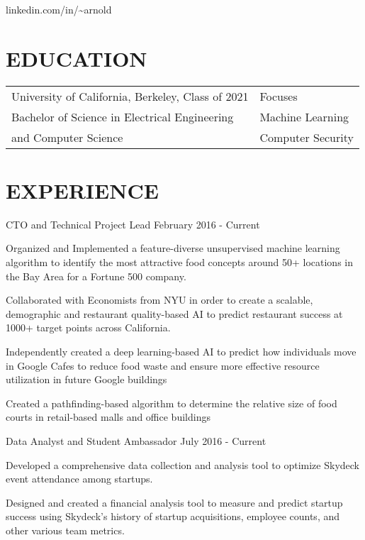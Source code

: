 \documentclass[10pt]{article}
\begin{document}
				 {linkedin.com/in/{\textasciitilde}arnold}      

\section*{EDUCATION}
		
		\begin{tabu}{X[l]X[c]}
			   University of California, Berkeley, Class of 2021 & Focuses \\
 			   Bachelor of Science in Electrical Engineering & Machine Learning \\ 
 			   and Computer Science & Computer Security  \\
		\end{tabu}

\section*{EXPERIENCE}

								{CTO and Technical Project Lead}
								{February 2016 - Current}                  		
	                   \begin{accomplishments} 
	                    		\item Organized and Implemented a feature-diverse unsupervised machine learning algorithm to identify the most attractive food concepts around 50+ locations in the Bay Area for a Fortune 500 company.
	                    		\item Collaborated with Economists from NYU in order to create a scalable, demographic and restaurant quality-based AI to predict restaurant success at 1000+ target points across California.
	                    		\item Independently created a deep learning-based AI to predict how individuals move in Google Cafes to reduce food waste and ensure more effective resource utilization in future Google buildings
	                    		\item Created a pathfinding-based algorithm to determine the relative size of food courts in retail-based malls and office buildings
	                    \end{accomplishments}
	                    		
	   		
	   			{Data Analyst and Student Ambassador}
	   			{July 2016 - Current}
			  		\begin{accomplishments}
	                   		\item Developed a comprehensive data collection and analysis tool to optimize Skydeck event attendance among startups.
	                   		\item Designed and created a financial analysis tool to measure and predict startup success using Skydeck's history of startup acquisitions, employee counts, and other various team metrics.
	                  \end{accomplishments}
                  	 
\end{document}
